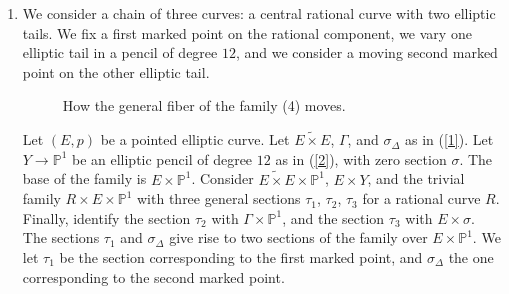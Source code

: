 \documentclass[10pt]{amsart}
\theoremstyle{definition}
\begin{document}
{\begin{enumerate}
The base of the family is $\mathbb{P}^1\times\mathbb{P}^1$. Let $\pi_i\colon \mathbb{P}^1\times\mathbb{P}^1\rightarrow\mathbb{P}^1$ be the projection on the $i$-th factor, for $i=1,2$, and let $x$ be the class of a point in $\mathbb{P}^1$. The divisor classes restrict as follows
\begin{eqnarray*}
\delta_{1,2} &=& c_1\left(N_{\sigma_1/Y_1} \right) + c_1\left(N_{\sigma_2/Y_2} \right) ={}-\pi_1^*(x)-\pi_2^*(x),\\
\delta_{0} &=& {}-12 c_1\left(N_{\sigma_1/Y_1} \right) -12 c_1\left(N_{\sigma_2/Y_2} \right) =12\pi_1^*(x)+12\pi_2^*(x),
\end{eqnarray*}
and we have
\begin{align*}
\delta_0^2 &= 288, & \delta_0\delta_{1,2} &= -24.
\end{align*}
For every fiber, the two marked points are in the same rational component. An admissible cover for a fiber of this family is ramified with order at least $2$ at the two singular points. By the Riemann-Hurwitz formula, no fiber of this family admits an admissible cover totally ramified at the two marked points. We deduce the following relation
\[
288 A_{\delta_0^2} -24A_{\delta_0\delta_{1,2}} = 0.
\]

\item We consider a chain of three curves: a central rational curve with two elliptic tails. We fix a first marked point on the rational component, we vary one elliptic tail in a pencil of degree $12$, and we consider a moving second marked point on the other elliptic tail.

\begin{figure}[htbp]
\centering
  
  

  \caption{How the general fiber of the family (4) moves.}
\end{figure}

Let $(E,p)$ be a pointed elliptic curve. Let $\widetilde{E\times E}$, $\Gamma$, and $\sigma_{\Delta}$ as in (\ref{1}). Let $Y\rightarrow \mathbb{P}^1$ be an elliptic pencil of degree $12$ as in (\ref{2}), with zero section $\sigma$. The base of the family is $E\times \mathbb{P}^1$. Consider $\widetilde{E\times E}\times \mathbb{P}^1$, $E\times Y$, and the trivial family $R\times E\times \mathbb{P}^1$ with three general sections $\tau_1$, $\tau_2$, $\tau_3$ for a rational curve $R$. Finally, identify the section $\tau_2$ with $\Gamma\times\mathbb{P}^1$, and the section $\tau_3$ with $E\times\sigma$. The sections  $\tau_1$ and $\sigma_{\Delta}$ give rise to two sections of the family over $E\times\mathbb{P}^1$. We let $\tau_1$ be the section corresponding to the first marked point, and $\sigma_{\Delta}$ the one corresponding to the second marked point.


\end{enumerate}}
\end{document}
